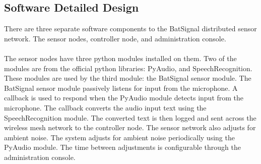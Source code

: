 \documentclass[11pt,a4paper]{article}
\begin{document}
\subsection{Software Detailed Design}
There are three separate software components to the BatSignal distributed sensor network.  The sensor nodes, controller node, and administration console. \\\\
The sensor nodes have three python modules installed on them. Two of the modules are from the official python libraries: PyAudio, and SpeechRecognition. These modules are used by the third module: the BatSignal sensor module. The BatSignal sensor module passively listens for input from the microphone. A callback is used to respond when the PyAudio module detects input from the microphone. The callback converts the audio input text using the SpeechRecognition module. The converted text is then logged and sent across the wireless mesh network to the controller node. The sensor network also adjusts for ambient noise.  The system adjusts for ambient noise periodically using the PyAudio module. The time between adjustments is configurable through the administration console. \\\\
\end{document}
